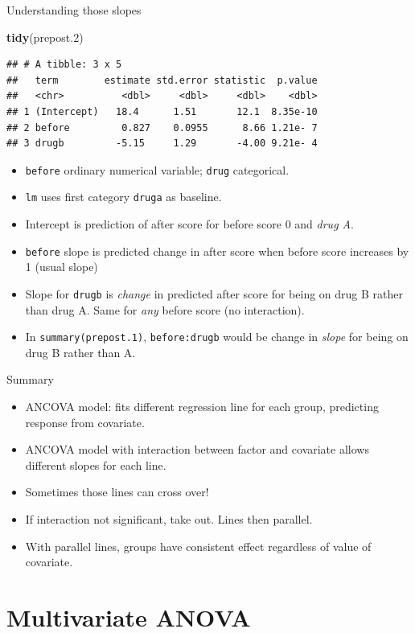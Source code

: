 \documentclass[ignorenonframetext,]{beamer}
\newenvironment{Shaded}{\begin{snugshade}}{\end{snugshade}}
\newcommand{\FloatTok}[1]{\textcolor[rgb]{0.00,0.00,0.81}{#1}}
\newcommand{\KeywordTok}[1]{\textcolor[rgb]{0.13,0.29,0.53}{\textbf{#1}}}
\newcommand{\NormalTok}[1]{#1}
\begin{document}
\begin{frame}[fragile]{Understanding those slopes}
\protect\hypertarget{understanding-those-slopes}{}

\begin{Shaded}
\begin{Highlighting}[]
\KeywordTok{tidy}\NormalTok{(prepost}\FloatTok{.2}\NormalTok{)}
\end{Highlighting}
\end{Shaded}

\begin{verbatim}
## # A tibble: 3 x 5
##   term        estimate std.error statistic  p.value
##   <chr>          <dbl>     <dbl>     <dbl>    <dbl>
## 1 (Intercept)   18.4      1.51       12.1  8.35e-10
## 2 before         0.827    0.0955      8.66 1.21e- 7
## 3 drugb         -5.15     1.29       -4.00 9.21e- 4
\end{verbatim}

\begin{itemize}
\item
  \texttt{before} ordinary numerical variable; \texttt{drug}
  categorical.
\item
  \texttt{lm} uses first category \texttt{druga} as baseline.
\item
  Intercept is prediction of after score for before score 0 and
  \emph{drug A}.
\item
  \texttt{before} slope is predicted change in after score when before
  score increases by 1 (usual slope)
\item
  Slope for \texttt{drugb} is \emph{change} in predicted after score for
  being on drug B rather than drug A. Same for \emph{any} before score
  (no interaction).
\item
  In \texttt{summary(prepost.1)}, \texttt{before:drugb} would be change
  in \emph{slope} for being on drug B rather than A.
\end{itemize}

\end{frame}

\begin{frame}{Summary}
\protect\hypertarget{summary}{}

\begin{itemize}
\item
  ANCOVA model: fits different regression line for each group,
  predicting response from covariate.
\item
  ANCOVA model with interaction between factor and covariate allows
  different slopes for each line.
\item
  Sometimes those lines can cross over!
\item
  If interaction not significant, take out. Lines then parallel.
\item
  With parallel lines, groups have consistent effect regardless of value
  of covariate.
\end{itemize}

\section{Multivariate ANOVA}
\frame{\sectionpage}

\end{frame}
\end{document}
